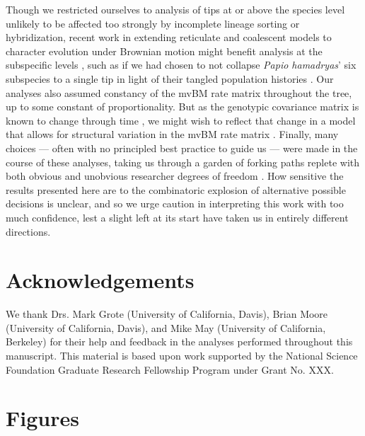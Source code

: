 \documentclass[10pt, twocolumn, twoside]{article}
\begin{document}
Though we restricted ourselves to analysis of tips at or above the species level unlikely to be affected too strongly by incomplete lineage sorting or hybridization, recent work in extending reticulate and coalescent models to character evolution under Brownian motion might benefit analysis at the subspecific levels \citep{bastidePhylogeneticComparativeMethods2018, mendesMultispeciesCoalescentModel2018}, such as if we had chosen to not collapse \textit{Papio hamadryas}' six subspecies to a single tip in light of their tangled population histories \citep{rogersComparativeGenomicsComplex2019}. Our analyses also assumed constancy of the mvBM rate matrix throughout the tree, up to some constant of proportionality. But as the genotypic covariance matrix is known to change through time \citep{arnoldUnderstandingEvolutionStability2008}, we might wish to reflect that change in a model that allows for structural variation in the mvBM rate matrix \citep{caetanoEstimatingCorrelatedRates2019}. Finally, many choices --- often with no principled best practice to guide us --- were made in the course of these analyses, taking us through a garden of forking paths replete with both obvious and unobvious researcher degrees of freedom \citep{simmonsFalsepositivePsychologyUndisclosed2011}. How sensitive the results presented here are to the combinatoric explosion of alternative possible decisions is unclear, and so we urge caution in interpreting this work with too much confidence, lest a slight left at its start have taken us in entirely different directions.

\section*{Acknowledgements}

We thank Drs. Mark Grote (University of California, Davis), Brian Moore (University of California, Davis), and Mike May (University of California, Berkeley) for their help and feedback in the analyses performed throughout this manuscript. This material is based upon work supported by the National Science Foundation
Graduate Research Fellowship Program under Grant No. XXX.

\clearpage
\onecolumn
\section{Figures}
\end{document}

